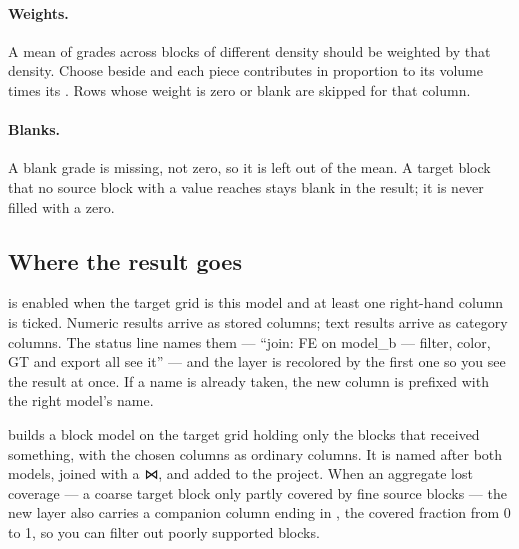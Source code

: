 \paragraph{Weights.} A mean of grades across blocks of different density should be weighted by that density. Choose  beside  and each piece contributes in proportion to its volume times its . Rows whose weight is zero or blank are skipped for that column.

\paragraph{Blanks.} A blank grade is missing, not zero, so it is left out of the mean. A target block that no source block with a value reaches stays blank in the result; it is never filled with a zero.

\subsection{Where the result goes}\label{sec:joins-where}

 is enabled when the target grid is this model and at least one right-hand column is ticked. Numeric results arrive as stored columns; text results arrive as category columns. The status line names them — “join: FE on model\_b — filter, color, GT and export all see it” — and the layer is recolored by the first one so you see the result at once. If a name is already taken, the new column is prefixed with the right model's name.

 builds a block model on the target grid holding only the blocks that received something, with the chosen columns as ordinary columns. It is named after both models, joined with a ⋈, and added to the project. When an aggregate lost coverage — a coarse target block only partly covered by fine source blocks — the new layer also carries a companion column ending in , the covered fraction from 0 to 1, so you can filter out poorly supported blocks.

